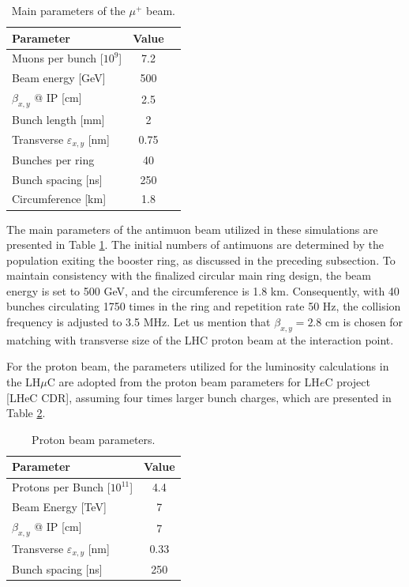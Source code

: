 \documentclass[a4paper,11pt]{article}
\begin{document}
\begin{table}[htbp]
\centering
\caption{Main parameters of the $\mu^+$ beam.}
\label{tab:muon_params}
\begin{tabular}{lcc}
\hline
\textbf{Parameter} &  \textbf{Value} \\
\hline
Muons per bunch [$10^9$] & 7.2 \\
Beam energy [GeV] & 500 \\
$\beta_{x,y}$ @ IP [cm] & 2.5 \\
Bunch length [mm] & 2 \\
Transverse $\varepsilon_{x,y}$ [nm] & 0.75 \\
Bunches per ring & 40 \\
Bunch spacing [ns] & 250 \\
Circumference [km] & 1.8 \\
\hline
\end{tabular}
\end{table}

The main parameters of the antimuon beam utilized in these simulations are presented in Table \ref{tab:muon_params}. The initial numbers of antimuons are determined by the population exiting the booster ring, as discussed in the preceding subsection. To maintain consistency with the finalized circular main ring design, the beam energy is set to 500 GeV, and the circumference is 1.8 km. Consequently, with 40 bunches circulating 1750 times in the ring and repetition rate 50 Hz, the collision frequency is adjusted to 3.5 MHz. Let us mention that $\beta_{x,y} = 2.8$ cm is chosen for matching with transverse size of the LHC proton beam at the interaction point.

For the proton beam, the parameters utilized for the luminosity calculations in the LH$\mu$C are adopted from the proton beam parameters for LH$e$C project [LHeC CDR], assuming four times larger bunch charges, which are presented in Table \ref{tab:proton_params}.

\begin{table}[htbp]
\centering
\caption{Proton beam parameters.}
\label{tab:proton_params}
\begin{tabular}{lc}
\hline
\textbf{Parameter} & \textbf{Value} \\
\hline
Protons per Bunch [$10^{11}$] & 4.4 \\
Beam Energy [TeV] & 7 \\
$\beta_{x,y}$ @ IP [cm] & 7 \\
Transverse $\varepsilon_{x,y}$ [nm] & 0.33 \\
Bunch spacing [ns] & 250 \\
\hline
\end{tabular}
\end{table}
\end{document}
